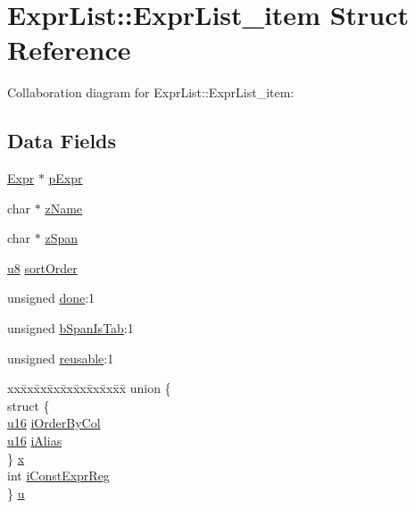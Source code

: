\hypertarget{struct_expr_list_1_1_expr_list__item}{}\section{Expr\+List\+:\+:Expr\+List\+\_\+item Struct Reference}
\label{struct_expr_list_1_1_expr_list__item}


Collaboration diagram for Expr\+List\+:\+:Expr\+List\+\_\+item\+:
\subsection*{Data Fields}
\begin{DoxyCompactItemize}
\item 
\hyperlink{struct_expr}{Expr} $\ast$ \hyperlink{struct_expr_list_1_1_expr_list__item_aab4193f0accd02e4c2e5e60e105c03ca}{p\+Expr}
\item 
char $\ast$ \hyperlink{struct_expr_list_1_1_expr_list__item_a661118d86ac4127d40bf3be78d92117d}{z\+Name}
\item 
char $\ast$ \hyperlink{struct_expr_list_1_1_expr_list__item_a16b42da8bcc375198f6e1942d1cfbfac}{z\+Span}
\item 
\hyperlink{sqlite3_8c_a74a0f6424ae628af25f23f0a35f6ead3}{u8} \hyperlink{struct_expr_list_1_1_expr_list__item_adc5b0d7a9f6be9946f07ce7eb4d00cb5}{sort\+Order}
\item 
unsigned \hyperlink{struct_expr_list_1_1_expr_list__item_aa195dadf0a13af092bd974c517f76f66}{done}\+:1
\item 
unsigned \hyperlink{struct_expr_list_1_1_expr_list__item_a2d1fb192f830751eb7dd8f77bd62cd90}{b\+Span\+Is\+Tab}\+:1
\item 
unsigned \hyperlink{struct_expr_list_1_1_expr_list__item_a60d9718cc6bd5984391c8bb60f7591bc}{reusable}\+:1
\item 
\begin{tabbing}
xx\=xx\=xx\=xx\=xx\=xx\=xx\=xx\=xx\=\kill
union \{\\
\>struct \{\\
\>\>\hyperlink{sqlite3_8c_a20f2299e322dcbde37cb07b16910b843}{u16} \hyperlink{struct_expr_list_1_1_expr_list__item_a4b8f02e23d9fc10b4ae35c2bfdbc13f2}{iOrderByCol}\\
\>\>\hyperlink{sqlite3_8c_a20f2299e322dcbde37cb07b16910b843}{u16} \hyperlink{struct_expr_list_1_1_expr_list__item_af91907a41864a1cd92daea4792728ee4}{iAlias}\\
\>\} \hyperlink{struct_expr_list_1_1_expr_list__item_a4b5438b50d2670a588b03fd443733a36}{x}\\
\>int \hyperlink{struct_expr_list_1_1_expr_list__item_a7a6cb52ea8d7946dbc9a8a7a6ed43d53}{iConstExprReg}\\
\} \hyperlink{struct_expr_list_1_1_expr_list__item_a1babb69a3d2e0768726db1a48ed7e25b}{u}\\

\end{tabbing}\end{DoxyCompactItemize}


